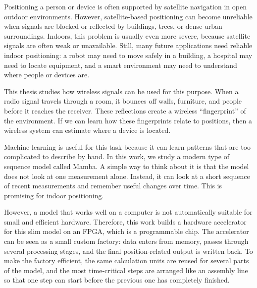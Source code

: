 \documentclass[11pt,twoside]{eitExjobb}
\makeatletter
\renewcommand\chapter{\clearpage\sh@chapter}
\makeatother
\begin{document}
\chapter*{Popular Science Summary}
Positioning a person or device is often supported by satellite navigation in
open outdoor environments. However, satellite-based positioning can become
unreliable when signals are blocked or reflected by buildings, trees, or dense
urban surroundings. Indoors, this problem is usually even more severe, because
satellite signals are often weak or unavailable. Still, many future applications need reliable indoor positioning: a robot
may need to move safely in a building, a hospital may need to locate equipment, and a
smart environment may need to understand where people or devices are.

This thesis studies how wireless signals can be used for this purpose. When a radio
signal travels through a room, it bounces off walls, furniture, and people before it
reaches the receiver. These reflections create a wireless ``fingerprint'' of the
environment. If we can learn how these fingerprints relate to positions, then a wireless
system can estimate where a device is located.

Machine learning is useful for this task because it can learn patterns that are too
complicated to describe by hand. In this work, we study a modern type of sequence model
called Mamba. A simple way to think about it is that the model does not look at one
measurement alone. Instead, it can look at a short sequence of recent measurements and
remember useful changes over time. This is promising for indoor positioning.

However, a model that works well on a computer is not automatically suitable for small
and efficient hardware. Therefore, this work builds a hardware accelerator for this
slim model on an FPGA, which is a programmable chip. The accelerator can be seen as a
small custom factory: data enters from memory, passes through several processing
stages, and the final position-related output is written back. To make the factory
efficient, the same calculation units are reused for several parts of the model, and
the most time-critical steps are arranged like an assembly line so that one step can
start before the previous one has completely finished.


\tableofcontents
\listoffigures
\listoftables
\clearpage
\mainmatter
\end{document}
